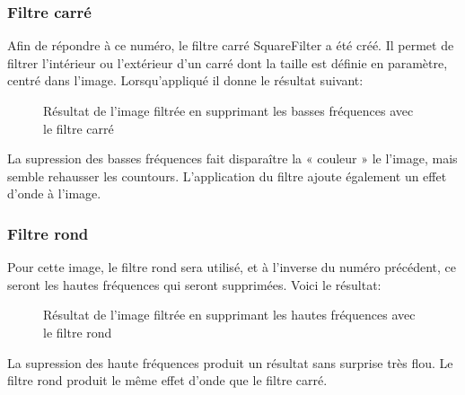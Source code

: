 \documentclass[12pt]{article}
\begin{document}
\subsubsection{Filtre carré}
Afin de répondre à ce numéro, le filtre carré SquareFilter a été créé. Il permet de filtrer l'intérieur ou l'extérieur d'un carré dont la taille est définie en paramètre, centré dans l'image. Lorsqu'appliqué il donne le résultat suivant:
\begin{figure}[ht]
  \centering
  \captionsetup{width=.8\linewidth}
  \caption{Résultat de l'image filtrée en supprimant les basses fréquences avec le filtre carré}
\end{figure}
La supression des basses fréquences fait disparaître la « couleur » le l'image, mais semble rehausser les countours. L'application du filtre ajoute également un effet d'onde à l'image.

\subsubsection{Filtre rond}
Pour cette image, le filtre rond sera utilisé, et à l'inverse du numéro précédent, ce seront les hautes fréquences qui seront supprimées. Voici le résultat:
\begin{figure}[ht]
  \centering
  \captionsetup{width=.8\linewidth}
  \caption{Résultat de l'image filtrée en supprimant les hautes fréquences avec le filtre rond}
\end{figure}
La supression des haute fréquences produit un résultat sans surprise très flou. Le filtre rond produit le même effet d'onde que le filtre carré.
\end{document}
